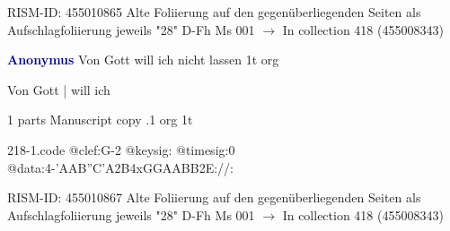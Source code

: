 \documentclass[twocolumn]{book}
\begin{document}
\newline RISM-ID: 455010865
\newline Alte Foliierung auf den gegenüberliegenden Seiten als Aufschlagfoliierung jeweils "28"
\newline D-Fh  Ms 001
\newline $\rightarrow$ In collection 418 (455008343)

\newline \par \vspace{7pt} \textcolor{darkblue}{\textbf{Anonymus  }}
\newline Von Gott will ich nicht lassen  1t  
\newline org
\newline \begin{itshape}[f.28r, at left:] Von Gott | will ich\end{itshape} 
\newline \textcolor{darkblue}{}  1 parts  
\newline Manuscript copy
.1  org  1t  
\begin{filecontents*}{218-1.code}
@clef:G-2
@keysig:
@timesig:0
@data:4-'AAB''C'A2B4xGGAABB2E://:
\end{filecontents*}
\newline
%

\newline RISM-ID: 455010867
\newline Alte Foliierung auf den gegenüberliegenden Seiten als Aufschlagfoliierung jeweils "28"
\newline D-Fh  Ms 001
\newline $\rightarrow$ In collection 418 (455008343)
\end{document}
